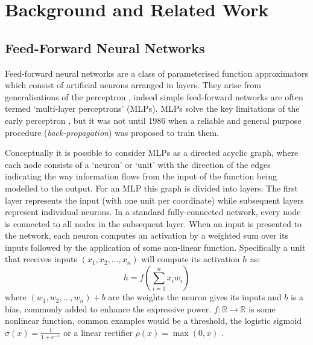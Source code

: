 
\chapter{Background and Related Work}\label{C:bg}
\section{Feed-Forward Neural Networks}
Feed-forward neural networks are a class of parameterised function approximators which consist of
artificial neurons arranged in layers. They arise from generalisations of the perceptron
\autocite{Rosenblatt1958},
indeed simple feed-forward networks are often termed `multi-layer perceptrons' (MLPs). MLPs solve
the key limitations of the early perceptron \autocite{Minsky1969}, but it was not until 1986
when a reliable and general purpose procedure (\emph{back-propagation}) was 
proposed \autocite{Rumelhart1986} to train them.

Conceptually it is possible to consider MLPs as a directed acyclic graph, where each node consists
of a `neuron' or `unit' with the direction of the edges indicating the way information flows from
the input of the function being modelled to the output. For an MLP this graph is divided into layers.
The first layer represents the input (with one unit per coordinate) while subsequent layers
represent individual neurons. In a standard fully-connected network, every node is connected to all
nodes in the subsequent layer. When an input is presented to the network, each neuron computes
an activation by a weighted sum over its inputs followed by the application of some non-linear
function. Specifically a unit that receives inputs \((x_1, x_2, \ldots, x_n)\) will compute its
activation \(h\) as:
\begin{equation}\label{eq:perceptron}
	h = f\left(\sum_{i=1}^n x_iw_i\right)
\end{equation} where \((w_1, w_2, \ldots, w_n) + b\) are the weights the neuron gives its inputs and
\(b\) is a bias, commonly added to enhance the expressive power.
\(f : \mathbb{R} \to \mathbb{R}\) is some nonlinear function, common examples would be a threshold,
the logistic sigmoid \(\sigma(x) = \frac{1}{1 + e^{-x}}\) or a linear rectifier
\(\rho(x) = \max(0, x)\) \autocite{Nair}.

